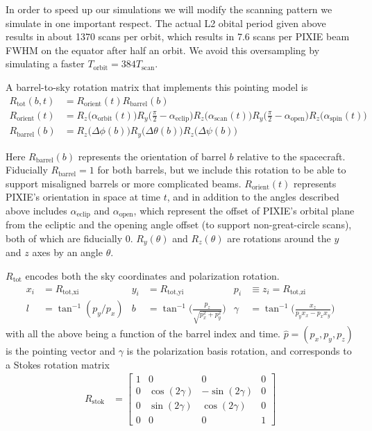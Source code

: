 \documentclass{article}
\begin{document}
In order to speed up our simulations we will modify the scanning pattern we
simulate in one important respect. The actual L2 obital
period given above results in about 1370 scans per orbit, which results in
7.6 scans per PIXIE beam FWHM on the equator after half an orbit. We avoid
this oversampling by simulating a faster $T_\textrm{orbit} = 384 T_\textrm{scan}$.

A barrel-to-sky rotation matrix that implements this pointing model is
\begin{align}
	R_\textrm{tot}(b,t)  &= R_\textrm{orient}(t)R_\textrm{barrel}(b) \\
	R_\textrm{orient}(t) &= R_z\big(\alpha_\textrm{orbit}(t)\big)
		R_y\Big(\frac\pi2-\alpha_\textrm{eclip}\Big)
		R_z\big(\alpha_\textrm{scan}(t)\big)R_y\Big(\frac\pi2-\alpha_\textrm{open}\Big)
		R_z\big(\alpha_\textrm{spin}(t)\big) \\
	R_\textrm{barrel}(b) &= R_z\big(\Delta\phi(b)\big)R_y\big(\Delta\theta(b)\big)R_z\big(\Delta\psi(b)\big) \label{eq:barrel}
\end{align}

Here $R_\textrm{barrel}(b)$ represents the orientation of barrel $b$ relative
to the spacecraft. Fiducially $R_\textrm{barrel} = 1$ for both barrels, but
we include this rotation to be able to support misaligned barrels or more
complicated beams. $R_\textrm{orient}(t)$ represents PIXIE's orientation
in space at time $t$, and in addition to the angles described above includes
$\alpha_\textrm{eclip}$ and $\alpha_\textrm{open}$, which represent the
offset of PIXIE's orbital plane from the ecliptic and the opening angle
offset (to support non-great-circle scans), both of which are fiducially 0.
$R_y(\theta)$ and $R_z(\theta)$ are rotations around the $y$ and $z$ axes
by an angle $\theta$.

$R_\textrm{tot}$ encodes both the sky coordinates and polarization rotation.
\begin{align}
	x_i &= R_\textrm{tot,xi} & y_i &= R_\textrm{tot,yi} & p_i &\equiv z_i = R_\textrm{tot,zi} \\
	l        &= \tan^{-1}(p_y/p_x)  &
	b        &= \tan^{-1}\Big(\frac{p_z}{\sqrt{p_x^2+p_y^2}}\Big) &
	\gamma   &= \tan^{-1}\Big(\frac{x_z}{p_y x_x - p_x x_y}\Big)
\end{align}
with all the above being a function of the barrel index and time.
$\hat p = (p_x,p_y,p_z)$ is the pointing vector and $\gamma$ is the
polarization basis rotation, and corresponds to a Stokes rotation
matrix
\begin{align}
	R_\textrm{stok} &= \begin{bmatrix}
		1 & 0 & 0 & 0\\
		0 & \cos(2\gamma) & -\sin(2\gamma) & 0\\
		0 & \sin(2\gamma) & \cos(2\gamma) & 0 \\
		0 & 0 & 0 & 1
	\end{bmatrix}
\end{align}
\end{document}
